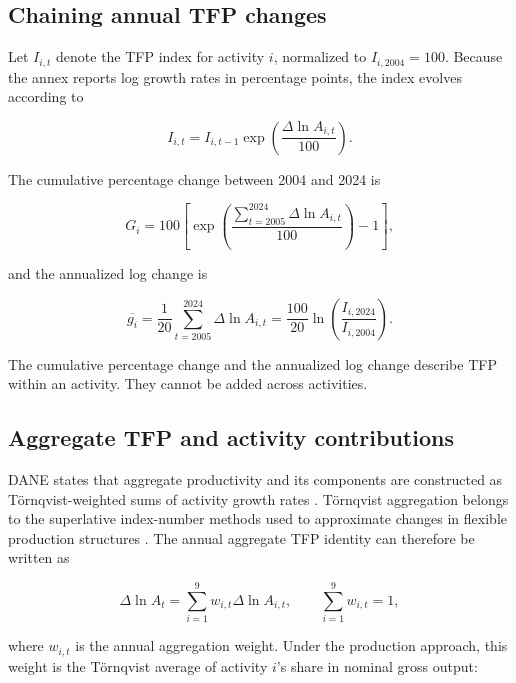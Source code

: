 \subsection{Chaining annual TFP changes}

Let \(I_{i,t}\) denote the TFP index for activity \(i\), normalized to \(I_{i,2004}=100\). Because the annex reports log growth rates in percentage points, the index evolves according to

\begin{equation}
I_{i,t}
=I_{i,t-1}
\exp\left(\frac{\Delta\ln A_{i,t}}{100}\right).
\label{eq:index_chain}
\end{equation}

The cumulative percentage change between 2004 and 2024 is

\begin{equation}
G_i
=100\left[
\exp\left(
\frac{\sum_{t=2005}^{2024}\Delta\ln A_{i,t}}{100}
\right)-1
\right],
\label{eq:cumulative_tfp}
\end{equation}

and the annualized log change is

\begin{equation}
\overline{g_i}
=\frac{1}{20}\sum_{t=2005}^{2024}\Delta\ln A_{i,t}
=\frac{100}{20}\ln\left(\frac{I_{i,2024}}{I_{i,2004}}\right).
\label{eq:annualized_tfp}
\end{equation}

The cumulative percentage change and the annualized log change describe TFP within an activity. They cannot be added across activities.

\subsection{Aggregate TFP and activity contributions}

DANE states that aggregate productivity and its components are constructed as T\"ornqvist-weighted sums of activity growth rates \citep{DANE2022TFP}. T\"ornqvist aggregation belongs to the superlative index-number methods used to approximate changes in flexible production structures \citep{Diewert1976}. The annual aggregate TFP identity can therefore be written as

\begin{equation}
\Delta\ln A_t
=\sum_{i=1}^{9}w_{i,t}\Delta\ln A_{i,t},
\qquad
\sum_{i=1}^{9}w_{i,t}=1,
\label{eq:aggregate_tfp}
\end{equation}

where \(w_{i,t}\) is the annual aggregation weight. Under the production approach, this weight is the T\"ornqvist average of activity \(i\)'s share in nominal gross output:

